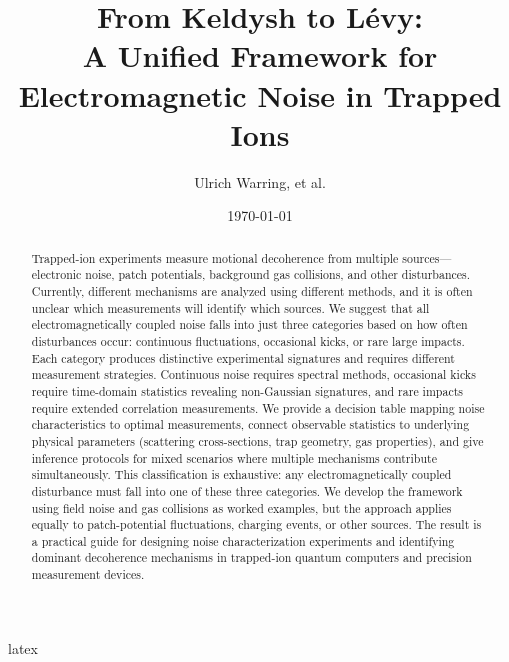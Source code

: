 \documentclass[11pt,a4paper]{article}
\title{From Keldysh to Lévy:\\
  A Unified Framework for Electromagnetic Noise in Trapped Ions}
\author[1]{Ulrich Warring, et al.}
\affil[1]{Physikalisches Institut, Universität Freiburg, Germany}
\date{\today}
\begin{document}
\maketitle

latex\begin{abstract}
Trapped-ion experiments measure motional decoherence from multiple sources—electronic noise, patch potentials, background gas collisions, and other disturbances. 
Currently, different mechanisms are analyzed using different methods, and it is often unclear which measurements will identify which sources.
We suggest that all electromagnetically coupled noise falls into just three categories based on how often disturbances occur: continuous fluctuations, occasional kicks, or rare large impacts.
Each category produces distinctive experimental signatures and requires different measurement strategies.
Continuous noise requires spectral methods, occasional kicks require time-domain statistics revealing non-Gaussian signatures, and rare impacts require extended correlation measurements.
We provide a decision table mapping noise characteristics to optimal measurements, connect observable statistics to underlying physical parameters (scattering cross-sections, trap geometry, gas properties), and give inference protocols for mixed scenarios where multiple mechanisms contribute simultaneously.
This classification is exhaustive: any electromagnetically coupled disturbance must fall into one of these three categories.
We develop the framework using field noise and gas collisions as worked examples, but the approach applies equally to patch-potential fluctuations, charging events, or other sources.
The result is a practical guide for designing noise characterization experiments and identifying dominant decoherence mechanisms in trapped-ion quantum computers and precision measurement devices.
\end{abstract}















\end{document}
